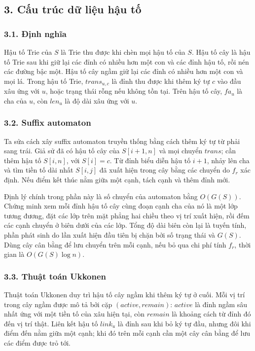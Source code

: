 \documentclass[11pt]{article}
\begin{document}
\subsection*{3. Cấu trúc dữ liệu hậu tố}

\subsubsection*{3.1. Định nghĩa}

Hậu tố Trie của \(S\) là Trie thu được khi chèn mọi hậu tố của \(S\). Hậu tố
cây là hậu tố Trie sau khi giữ lại các đỉnh có nhiều hơn một con và các đỉnh
hậu tố, rồi nén các đường bậc một. Hậu tố cây ngầm giữ lại các đỉnh có nhiều
hơn một con và mọi lá. Trong hậu tố Trie, \(trans_{u,c}\) là đỉnh thu được khi
thêm ký tự \(c\) vào đầu xâu ứng với \(u\), hoặc trạng thái rỗng nếu không tồn
tại. Trên hậu tố cây, \(fa_u\) là cha của \(u\), còn \(len_u\) là độ dài xâu
ứng với \(u\).

\subsubsection*{3.2. Suffix automaton}

Ta sửa cách xây suffix automaton truyền thống bằng cách thêm ký tự từ phải sang
trái. Giả sử đã có hậu tố cây của \(S[i+1,n]\) và mọi chuyển \(trans\); cần
thêm hậu tố \(S[i,n]\), với \(S[i]=c\). Từ đỉnh biểu diễn hậu tố \(i+1\), nhảy
lên cha và tìm tiền tố dài nhất \(S[i,j]\) đã xuất hiện trong cây bằng các
chuyển do \(f_r\) xác định. Nếu điểm kết thúc nằm giữa một cạnh, tách cạnh và
thêm đỉnh mới.

Định lý chính trong phần này là số chuyển của automaton bằng \(O(G(S))\). Chứng
minh xem mỗi đỉnh hậu tố cây cùng đoạn cạnh cha của nó là một lớp tương đương,
đặt các lớp trên mặt phẳng hai chiều theo vị trí xuất hiện, rồi đếm các cạnh
chuyển ở biên dưới của các lớp. Tổng độ dài biên còn lại là tuyến tính, phần
phát sinh do lần xuất hiện đầu tiên bị chặn bởi số trạng thái và \(G(S)\).
Dùng cây cân bằng để lưu chuyển trên mỗi cạnh, nếu bỏ qua chi phí tính \(f_r\),
thời gian là \(O(G(S)\log n)\).

\subsubsection*{3.3. Thuật toán Ukkonen}

Thuật toán Ukkonen duy trì hậu tố cây ngầm khi thêm ký tự ở cuối. Mỗi vị trí
trong cây ngầm được mô tả bởi cặp \((active,remain)\): \(active\) là đỉnh
ngầm sâu nhất ứng với một tiền tố của xâu hiện tại, còn \(remain\) là khoảng
cách từ đỉnh đó đến vị trí thật. Liên kết hậu tố \(link_u\) là đỉnh sau khi bỏ
ký tự đầu, nhưng đôi khi điểm đến nằm giữa một cạnh; khi đó trên mỗi cạnh cần
một cây cân bằng để lưu các điểm được trỏ tới.
\end{document}
